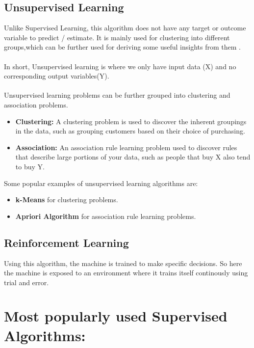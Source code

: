 \documentclass[Proceedings]{ascelike}
\begin{document}
\subsection{Unsupervised Learning}
 Unlike Supervised Learning, this algorithm does not have any target or outcome variable to predict / estimate.  It is mainly used for clustering into different groups,which can be further used for deriving some useful insights from them .\\
\\In short, Unsupervised learning is where we only have input data (X) and no corresponding output variables(Y).\\
\\Unsupervised learning problems can be further grouped into clustering and association problems.
\begin{itemize}
	\item \textbf{Clustering:} A clustering problem is used to discover the inherent groupings in the data, such as grouping customers based on their choice of purchasing. 
	\item \textbf{Association:}  An association rule learning problem used to discover rules that describe large portions of your data, such as people that buy X also tend to buy Y.
	 
\end{itemize}
Some popular examples of unsupervised learning algorithms are:
\begin{itemize}
	\item \textbf{k-Means} for clustering problems.
	\item \textbf{Apriori Algorithm} for association rule learning problems.
\end{itemize}

\subsection{Reinforcement Learning}
Using this algorithm, the machine is trained to make specific decisions. So here the machine is exposed to an environment where it trains itself continously using trial and error. %

\section{Most popularly used Supervised Algorithms:}
\end{document}
